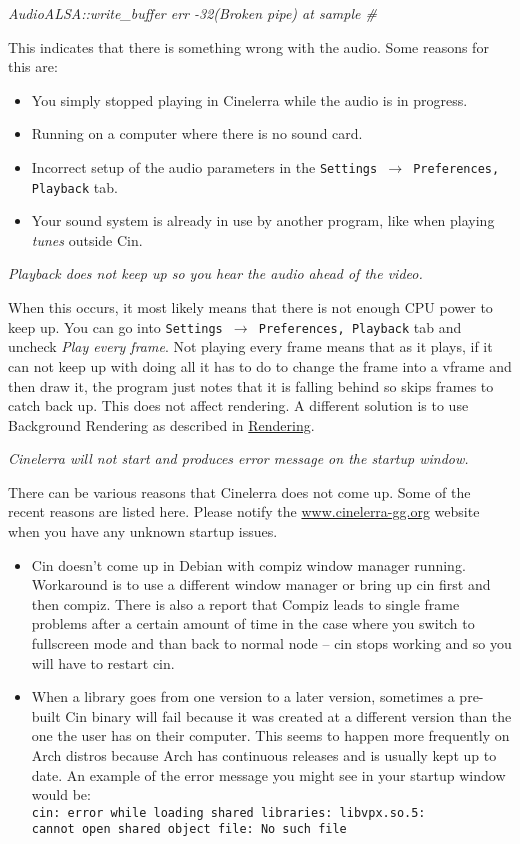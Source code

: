 \textit{AudioALSA::write\_buffer err -32(Broken pipe) at sample \#}

This indicates that there is something wrong with the audio. Some reasons for this are:
\begin{itemize}[nosep]
	\item You simply stopped playing in Cinelerra while the audio is in progress.
	\item Running on a computer where there is no sound card.
	\item Incorrect setup of the audio parameters in the \texttt{Settings $\rightarrow$ Preferences, Playback} tab.
	\item Your sound system is already in use by another program, like when playing \textit{tunes} outside Cin.
\end{itemize}
\bigskip

\textit{Playback does not keep up so you hear the audio ahead of the video.}

When this occurs, it most likely means that there is not enough CPU power to keep up. You can go into \texttt{Settings $\rightarrow$ Preferences, Playback} tab and uncheck \textit{Play every frame}. Not playing every frame means that as it plays, if it can not keep up with doing all it has to do to change the frame into a vframe and then draw it, the program just notes that it is falling behind so skips frames to catch back up. This does not affect rendering. A different solution is to use Background Rendering as described in \href{sec:background_rendering}{Rendering}.
\bigskip

\textit{Cinelerra will not start and produces error message on the startup window.}

There can be various reasons that Cinelerra does not come up. Some of the recent reasons are listed here. Please notify the {\small \href{http://www.cinelerra-gg.org/}{www.cinelerra-gg.org}} website when you have any unknown startup issues.
\medskip

\begin{itemize}[nosep]
	\item Cin doesn't come up in Debian with compiz window manager running. Workaround is to use a different window manager or bring up cin first and then compiz. There is also a report that Compiz leads to single frame problems after a certain amount of time in the case where you switch to fullscreen mode and than back to normal node -- cin stops working and so you will have to restart cin.
	\item When a library goes from one version to a later version, sometimes a pre-built Cin binary will fail because it was created at a different version than the one the user has on their computer. This seems to happen more frequently on Arch distros because Arch has continuous releases and is usually kept up to date. An example of the error message you might see in your startup window would be:\\
	\texttt{cin: error while loading shared libraries: libvpx.so.5: \\
	cannot open shared object file: No such file}
\end{itemize}
\medskip

